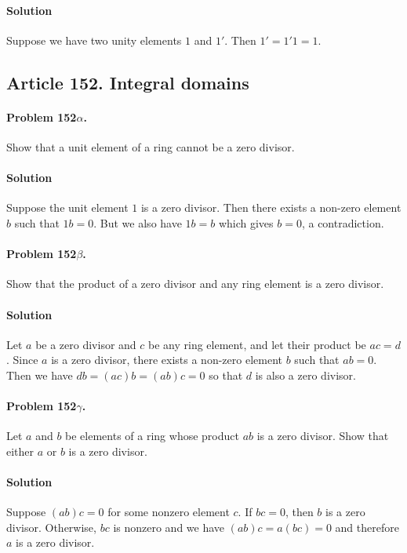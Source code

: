 \paragraph*{Solution}
Suppose we have two unity elements $1 $ and $1'$. Then $ 1' = 1' 1 = 1$.

\subsection{Article 152. Integral domains}

\paragraph{Problem 152$\alpha$.}
Show that a unit element of a ring cannot be a zero divisor.

\paragraph*{Solution}
Suppose the unit element $1$ is a zero divisor. Then there exists a non-zero
element $ b $ such that $ 1 b = 0$. But we also have $ 1 b = b$ which gives $ b
= 0$, a contradiction.

\paragraph{Problem 152$\beta$.}
Show that the product of a zero divisor and any ring element is a zero divisor.

\paragraph*{Solution}
Let $a$ be a zero divisor and $c$ be any ring element, and let their product be
$ ac = d$. Since $a$ is a zero divisor, there exists a non-zero element $b$
such that $ab = 0$. Then we have $ db = (ac)b = (ab)c = 0 $ so that $d$ is also
a zero divisor.

\paragraph{Problem 152$\gamma$.}
Let $a$ and $b$ be elements of a ring whose product $ab$ is a zero divisor. Show
that either $a$ or $b$ is a zero divisor.

\paragraph*{Solution}
Suppose $(ab)c = 0$ for some nonzero element $c$. If $bc=0$,
then $b$ is a zero divisor. Otherwise, $bc$ is nonzero and we have
$(ab)c = a(bc) = 0$ and therefore $a$ is a zero divisor.

